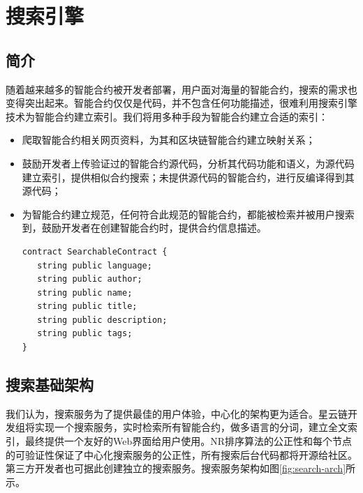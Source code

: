 \section{搜索引擎}
\label{sec:search}

\subsection{简介}

随着越来越多的智能合约被开发者部署，用户面对海量的智能合约，搜索的需求也变得突出起来。智能合约仅仅是代码，并不包含任何功能描述，很难利用搜索引擎技术为智能合约建立索引。我们将用多种手段为智能合约建立合适的索引：
\begin{itemize}
	\item 爬取智能合约相关网页资料，为其和区块链智能合约建立映射关系；
	\item 鼓励开发者上传验证过的智能合约源代码，分析其代码功能和语义，为源代码建立索引，提供相似合约搜索；未提供源代码的智能合约，进行反编译得到其源代码；
	\item 为智能合约建立规范，任何符合此规范的智能合约，都能被检索并被用户搜索到，鼓励开发者在创建智能合约时，提供合约信息描述。
	\begin{lstlisting}[frame=single]
contract SearchableContract {
   string public language;
   string public author;
   string public name;
   string public title;
   string public description;
   string public tags;
}
	\end{lstlisting}
\end{itemize}

\subsection{搜索基础架构}

我们认为，搜索服务为了提供最佳的用户体验，中心化的架构更为适合。星云链开发组将实现一个搜索服务，实时检索所有智能合约，做多语言的分词，建立全文索引，最终提供一个友好的Web界面给用户使用。NR排序算法的公正性和每个节点的可验证性保证了中心化搜索服务的公正性，所有搜索后台代码都将开源给社区。第三方开发者也可据此创建独立的搜索服务。搜索服务架构如图\ref{fig:search-arch}所示。

